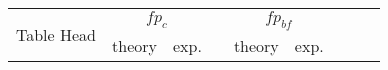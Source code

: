 \documentclass[11pt, twocolumn]{article}
\begin{document}
\begin{tabular}{ccccccccc} %
\multirow{2}{*}{
\parbox[c]{.2\linewidth}{\centering Table Head}}
  & \multicolumn{2}{c}{$fp_{c}$} &&
\multicolumn{2}{c}{$fp_{bf}$} \\ 
\cmidrule{2-3} \cmidrule{5-6}

 & {\centering theory} & {exp.} && {theory} & {exp.}  \\

\end{tabular}
\end{document}
